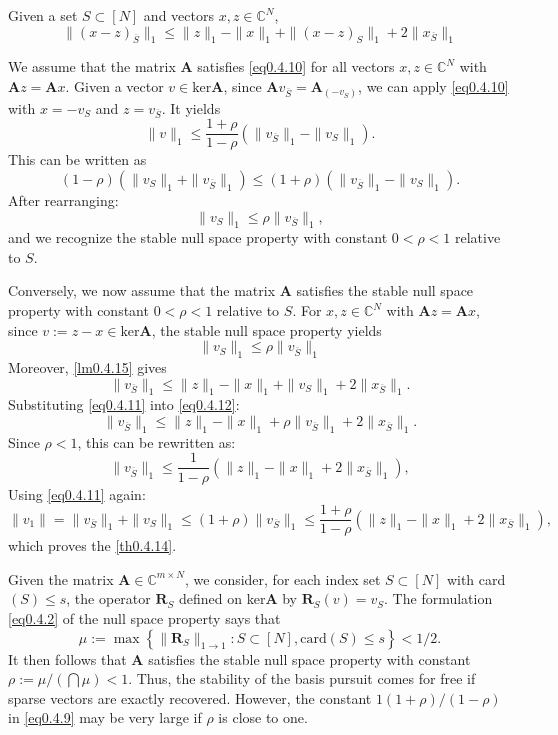 \begin{lemma}
    \label{lm0.4.15}
    Given a set $S \subset [N]$ and vectors $x,z \in \mathbb{C}^N$,
    \[
        \|(x-z)_{\overline{S}}\|_1 \leq \|z\|_1 - \|x\|_1 + \|(x-z)_S\|_1 + 2\|x_{\overline{S}}\|_1
    \]
\end{lemma}

We assume that the matrix $\mathbf{A}$ satisfies \cref{eq0.4.10} for all vectors $x,z \in \mathbb{C}^N$ with $\mathbf{A}z = \mathbf{A}x$. Given a vector $v \in \text{ker}\mathbf{A}$, since $\mathbf{A}v_{\overline{S}} = \mathbf{A}_{(-v_S)}$, we can apply \cref{eq0.4.10} with $x = -v_S$ and $z = v_{\overline{S}}$. It yields
\[
    \|v\|_1 \leq \frac{1+\rho}{1-\rho}\left( \|v_{\overline{S}}\|_1 - \|v_S\|_1 \right).
\]
This can be written as 
\[
    (1-\rho)(\|v_S\|_1 + \|v_{\overline{S}}\|_1) \leq (1+\rho)(\|v_{\overline{S}}\|_1 - \|v_S\|_1).
\]
After rearranging:
\[
    \|v_S\|_1 \leq \rho \|v_{\overline{S}}\|_1,
\]
and we recognize the stable null space property with constant $0 < \rho <1$ relative to $S$.

Conversely, we now assume that the matrix $\mathbf{A}$ satisfies the stable null space property with constant $0<\rho<1$ relative to $S$. For $x,z \in \mathbb{C}^N$ with $\mathbf{A}z = \mathbf{A}x$, since $v := z-x \in \text{ker}\mathbf{A}$, the stable null space property yields
\begin{equation}
    \|v_S\|_1 \leq \rho \|v_{\overline{S}}\|_1
    \label{eq0.4.11}
\end{equation}
Moreover, \cref{lm0.4.15} gives
\begin{equation}
    \|v_{\overline{S}}\|_1 \leq \|z\|_1 - \|x\|_1 + \|v_S\|_1 + 2\|x_{\overline{S}}\|_1.
    \label{eq0.4.12}
\end{equation}
Substituting \cref{eq0.4.11} into \cref{eq0.4.12}:
\[
    \|v_{\overline{S}}\|_1 \leq \|z\|_1 - \|x\|_1 + \rho \|v_{\overline{S}}\|_1 + 2\|x_{\overline{S}}\|_1.
\]
Since $\rho < 1$, this can be rewritten as:
\[
    \|v_{\overline{S}}\|_1 \leq \frac{1}{1-\rho}\left( \|z\|_1 -\|x\|_1 + 2\|x_{\overline{S}}\|_1 \right),
\]
Using \cref{eq0.4.11} again:
\[
    \|v_1\| = \|v_{\overline{S}}\|_1 + \|v_S\|_1 \leq (1+\rho)\|v_{\overline{S}}\|_1 \leq \frac{1+\rho}{1-\rho}\left( \|z\|_1 - \|x\|_1 + 2\|x_{\overline{S}}\|_1 \right),
\]
which proves the \cref{th0.4.14}.


\begin{remark}
    \label{rmk0.4.16}
    Given the matrix $\mathbf{A} \in \mathbb{C}^{m \times N}$, we consider, for each index set $S \subset [N]$ with card$(S) \leq s$, the operator $\mathbf{R}_S$ defined on ker$\mathbf{A}$ by $\mathbf{R}_S(v) = v_S$. The formulation \cref{eq0.4.2} of the null space property says that
    \[
        \mu := \max\left\{ \|\mathbf{R}_S\|_{1\rightarrow 1} : S \subset [N], \text{card}(S) \leq s \right\} < 1/2.
    \]
    It then follows that $\mathbf{A}$ satisfies the stable null space property with constant $\rho := \mu / (\bigcap\mu)<1$. Thus, the stability of the basis pursuit comes for free if sparse vectors are exactly recovered. However, the constant $1(1+\rho)/(1-\rho)$ in \cref{eq0.4.9} may be very large if $\rho$ is close to one.
\end{remark}

